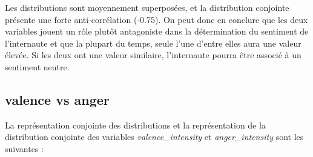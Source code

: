 \documentclass{article}
\begin{document}
Les distributions sont moyennement superposées, et la distribution conjointe présente une
forte anti-corrélation (-0.75). On peut donc en conclure que les deux variables jouent
un rôle plutôt antagoniste dans la détermination du sentiment de l'internaute et que
la plupart du temps, seule l'une d'entre elles aura une valeur élevée. Si les deux ont une
valeur similaire, l'internaute pourra être associé à un sentiment neutre.

\subsection*{valence vs anger}

La représentation conjointe des distributions et la représentation de la
distribution conjointe des variables
\textit{valence\_intensity} et \textit{anger\_intensity}
sont les suivantes :
\end{document}
